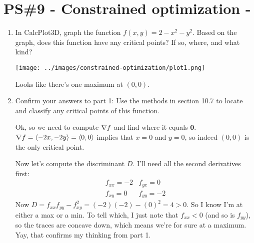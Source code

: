 


%


\allowdisplaybreaks
\section{PS\#9 - Constrained optimization -  }


\begin{enumerate}[leftmargin=0pt]
    
    \item In CalcPlot3D, graph the function $f(x,y) = 2- x^2 - y^2$. Based on the graph, does this function have any critical points? If so, where, and what kind?
    \begin{center}
        \texttt{[image: ../images/constrained-optimization/plot1.png]}
    \end{center}
    
    \begin{red}
    Looks like there's one maximum at $(0,0)$.
    \end{red}
    \item Confirm your answers to part 1: Use the methods in section 10.7 to locate and classify any critical points of this function.
    
    \begin{red}
    Ok, so we need to compute $\nabla f$ and find where it equals $\mathbf{0}$. $\nabla f = \langle -2x, -2y\rangle = \langle0, 0\rangle$ implies that $x=0$ and $y=0$, so indeed $(0, 0)$ is the only critical point.
    
    Now let's compute the discriminant $D$. I'll need all the second derivatives first:
    \[\begin{array}{cc}
        f_{xx} = -2 & f_{yx} = 0 \\
        f_{xy} = 0 & f_{yy} = -2
    \end{array}
    \]
    Now $D = f_{xx} f_{yy} - f_{xy}^2 = (-2)(-2) - (0)^2 = 4 > 0$. So I know I'm at either a max or a min. To tell which, I just note that $f_{xx} < 0$ (and so is $f_{yy}$), so the traces are concave down, which means we're for sure at a maximum. Yay, that confirms my thinking from part 1.
    \end{red}
    
    \pagebreak
    

\end{enumerate}
